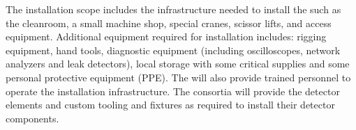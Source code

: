 The installation scope includes the infrastructure needed to install
the  such as the cleanroom, a small machine shop, special
cranes, scissor lifts, and access equipment.  Additional equipment
required for installation includes: rigging equipment, hand tools,
diagnostic equipment (including oscilloscopes, network analyzers and
leak detectors), local storage with some critical supplies and some
personal protective equipment (PPE). The  will also provide
trained personnel to operate the installation infrastructure. The
consortia will provide the detector elements and custom tooling and
fixtures as required to install their detector components.


 







